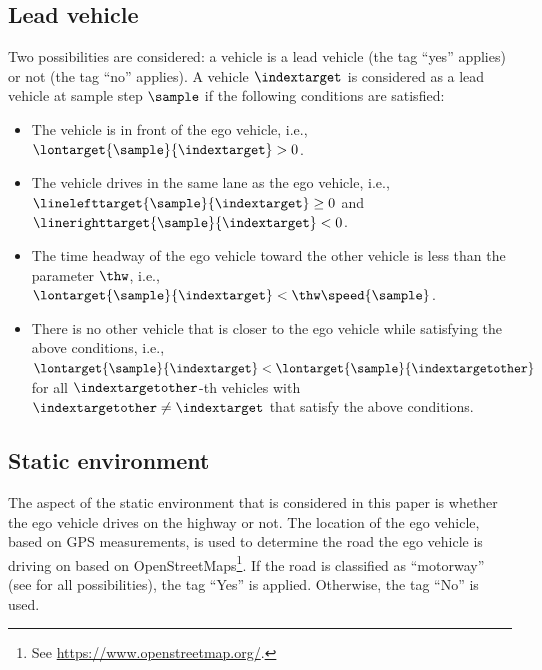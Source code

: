 \subsection{Lead vehicle}
\label{sec:lead vehicle}

Two possibilities are considered: a vehicle is a lead vehicle (the tag ``yes'' applies) or not (the tag ``no'' applies). A vehicle $\indextarget$ is considered as a lead vehicle at sample step $\sample$ if the following conditions are satisfied:
\begin{itemize}
	\item The vehicle is in front of the ego vehicle, i.e., $\lontarget{\sample}{\indextarget}>0$.
	\item The vehicle drives in the same lane as the ego vehicle, i.e., $\linelefttarget{\sample}{\indextarget} \geq 0$ and $\linerighttarget{\sample}{\indextarget} < 0$.
	\item The time headway of the ego vehicle toward the other vehicle is less than the parameter $\thw$, i.e., $\lontarget{\sample}{\indextarget} 
	< \thw \speed{\sample}$.
	\item There is no other vehicle that is closer to the ego vehicle while satisfying the above conditions, i.e., $\lontarget{\sample}{\indextarget} < \lontarget{\sample}{\indextargetother}$ for all $\indextargetother$-th vehicles with $\indextargetother \ne \indextarget$ that satisfy the above conditions.
\end{itemize}
\cendc



\subsection{Static environment}
\label{sec:static environment}

\cstartc
The aspect of the static environment that is considered in this paper is whether the ego vehicle drives on the highway or not. The location of the ego vehicle, based on GPS measurements, is used to determine the road the ego vehicle is driving on based on OpenStreetMaps\footnote{\cstartc See \url{https://www.openstreetmap.org/}.\cendc}. If the road is classified as ``motorway'' (see \autocite{osm_highway} for all possibilities), the tag ``Yes'' is applied. Otherwise, the tag ``No'' is used.
\cendc
